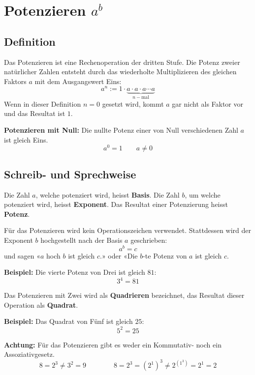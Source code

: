 \newpage
\section{Potenzieren $a^{b}$}

\subsection{Definition}

Das Potenzieren ist eine Rechenoperation der dritten Stufe. Die Potenz zweier natürlicher Zahlen entsteht durch das wiederholte Multiplizieren des gleichen Faktors $a$ mit dem Ausgangswert Eins:
\[
  a^{n} := 1\cdot\underbrace{a\cdot a\cdot a\cdots a}_{n-\text{mal}}
\]
Wenn in dieser Definition $n=0$ gesetzt wird, kommt $a$ gar nicht als Faktor vor und das Resultat ist $1$.
\begin{theorem}
  \textbf{Potenzieren mit Null:} Die nullte Potenz einer von Null verschiedenen Zahl $a$ ist gleich Eins.
  \[
    a^{0} = 1 \qquad a \ne 0
  \]
\end{theorem}

\subsection{Schreib- und Sprechweise}
Die Zahl $a$, welche potenziert wird, heisst \textbf{Basis}. Die Zahl $b$, um welche potenziert wird, heisst \textbf{Exponent}. Das Resultat einer Potenzierung heisst \textbf{Potenz}.

Für das Potenzieren wird kein Operationszeichen verwendet. Stattdessen wird der Exponent $b$ hochgestellt nach der Basis $a$ geschrieben:
\[
  a^{b} = c
\]
und sagen «$a$ hoch $b$ ist gleich $c$.» oder «Die $b$-te Potenz von $a$ ist gleich $c$.
\begin{example}
  \textbf{Beispiel:} Die vierte Potenz von Drei ist gleich $81$:
  \[
    3^{4} = 81
  \]
\end{example}
Das Potenzieren mit Zwei wird als \textbf{Quadrieren} bezeichnet, das Resultat dieser Operation als \textbf{Quadrat}.
\begin{example}
  \textbf{Beispiel:} Das Quadrat von Fünf ist gleich $25$:
  \[
    5^{2} = 25
  \]
\end{example}
\begin{note}
  \textbf{Achtung:} Für das Potenzieren gibt es weder ein Kommutativ- noch ein Assoziativgesetz.
  \[
    8 = 2^{3} \ne 3^{2} = 9 \qquad\qquad 8 = 2^{3} = \left(2^{1}\right)^{3} \ne 2^{(1^{3})} = 2^{1} = 2
  \]
\end{note}

